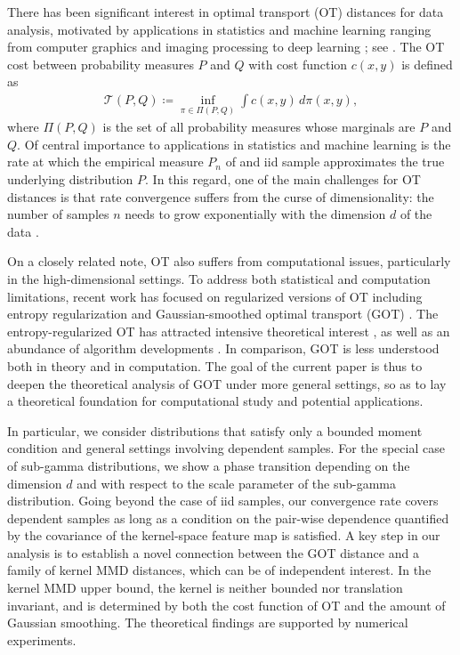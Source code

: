 \documentclass{article}
\theoremstyle{definition}
\newcommand{\cT}{\mathcal{T}}
\begin{document}
There has been significant interest in optimal transport (OT) distances for data analysis,
motivated by applications in statistics and machine learning
ranging from computer graphics and imaging processing \cite{solomon2014earth,ryu2018vector, li2018parallel}
to deep learning \cite{courty2016optimal,shen2017wasserstein, bhushan2018deepjdot}; see \cite{peyre:2019}. 
The OT cost between probability measures $P$ and $Q$  with cost function $c(x,y)$ is defined as
\begin{align}
\cT(P, Q) \coloneqq \inf _{\pi \in \Pi(P, Q)} \int c(x,y)\,  d \pi(x, y),
\end{align}
where $\Pi(P,Q)$ is the set of all probability measures whose marginals are $P$ and $Q$.
Of central importance to applications in statistics and machine learning is the rate at which the empirical measure $P_n$ of and iid sample approximates the true underlying distribution $P$.  %
In this regard, one of the main challenges for OT distances is that rate convergence suffers from the curse of dimensionality: the number of samples $n$ needs to grow exponentially with the dimension $d$ of the data  \cite{fournier:2015}.

On a closely related note, OT also suffers from
 computational issues, particularly in the high-dimensional settings. To address both statistical and computation limitations, recent work has focused on regularized versions of OT including entropy regularization \cite{cuturi2013sinkhorn} and Gaussian-smoothed optimal transport (GOT) \cite{goldfeld:2020b}. 
The entropy-regularized OT has attracted intensive theoretical interest \cite{feydy2019interpolating,klatt2020empirical,bigot2019central},
as well as an abundance of algorithm developments \cite{gerber2017multiscale,abid2018greedy, chakrabarty2020better}.
In comparison, GOT is less understood both in theory and in computation. The goal of the current paper is thus to deepen the theoretical analysis of GOT under more general settings,
so as to lay a theoretical foundation for computational study and potential applications.

In particular, we consider distributions that satisfy only a bounded moment condition and general settings involving dependent samples. %
%
For the special case of sub-gamma distributions, we show a phase transition depending on the dimension $d$ and with respect to the scale parameter of the sub-gamma distribution. 
Going beyond the case of iid samples,
our convergence rate covers dependent samples as long as a condition on the pair-wise dependence quantified by the covariance of the kernel-space feature map is satisfied.
%
A key step in our analysis is to establish a novel connection between the GOT distance and a family of kernel MMD distances,
which can be of independent interest.
In the kernel MMD upper bound, 
the kernel is neither bounded nor translation invariant,
and is determined by both the cost function of OT and the amount of Gaussian smoothing. 
%
The theoretical findings are supported by numerical experiments.
\end{document}
